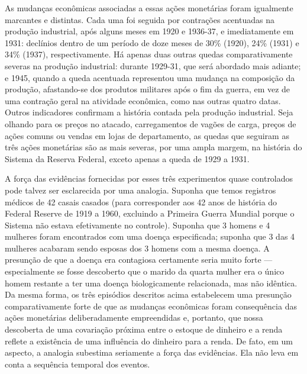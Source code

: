 \documentclass[12pt]{article}
\begin{document}
As mudanças econômicas associadas a essas ações monetárias foram igualmente marcantes e distintas. Cada uma foi seguida por contrações acentuadas na produção industrial, após alguns meses em 1920 e 1936-37, e imediatamente em 1931: declínios dentro de um período de doze meses de 30\% (1920), 24\% (1931) e 34\% (1937), respectivamente. Há apenas duas outras quedas comparativamente severas na produção industrial: durante 1929-31, que será abordado mais adiante; e 1945, quando a queda acentuada representou uma mudança na composição da produção, afastando-se dos produtos militares após o fim da guerra, em vez de uma contração geral na atividade econômica, como nas outras quatro datas. Outros indicadores confirmam a história contada pela produção industrial. Seja olhando para os preços no atacado, carregamentos de vagões de carga, preços de ações comuns ou vendas em lojas de departamento, as quedas que seguiram as três ações monetárias são as mais severas, por uma ampla margem, na história do Sistema da Reserva Federal, exceto apenas a queda de 1929 a 1931.

A força das evidências fornecidas por esses três experimentos quase controlados pode talvez ser esclarecida por uma analogia. Suponha que temos registros médicos de 42 casais casados (para corresponder aos 42 anos de história do Federal Reserve de 1919 a 1960, excluindo a Primeira Guerra Mundial porque o Sistema não estava efetivamente no controle). Suponha que 3 homens e 4 mulheres foram encontrados com uma doença especificada; suponha que 3 das 4 mulheres acabaram sendo esposas dos 3 homens com a mesma doença. A presunção de que a doença era contagiosa certamente seria muito forte — especialmente se fosse descoberto que o marido da quarta mulher era o único homem restante a ter uma doença biologicamente relacionada, mas não idêntica. Da mesma forma, os três episódios descritos acima estabelecem uma presunção comparativamente forte de que as mudanças econômicas foram consequência das ações monetárias deliberadamente empreendidas e, portanto, que nossa descoberta de uma covariação próxima entre o estoque de dinheiro e a renda reflete a existência de uma influência do dinheiro para a renda. De fato, em um aspecto, a analogia subestima seriamente a força das evidências. Ela não leva em conta a sequência temporal dos eventos.
\end{document}
